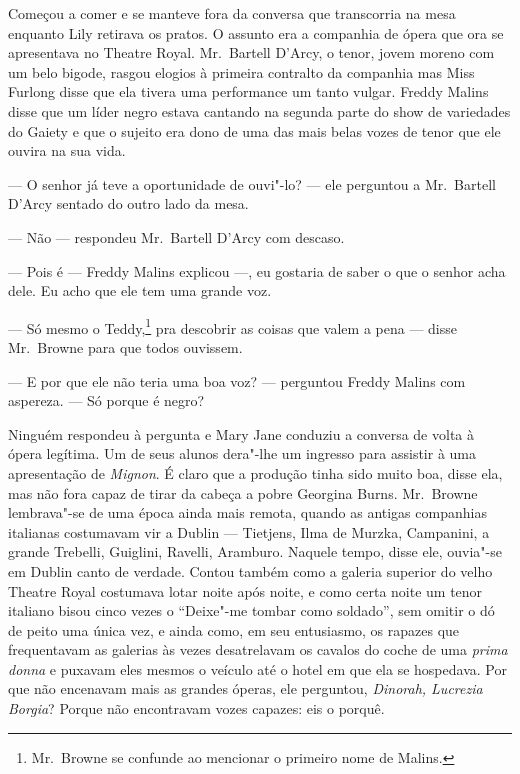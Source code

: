 Começou a comer e se manteve fora da conversa que transcorria na mesa enquanto
Lily retirava os pratos.  O assunto era a companhia de ópera que ora se
apresentava no Theatre Royal.  Mr.~Bartell D’Arcy, o tenor, jovem moreno com um
belo bigode, rasgou elogios à primeira contralto da companhia mas Miss Furlong
disse que ela tivera uma performance um tanto vulgar.  Freddy Malins disse que
um líder negro estava cantando na segunda parte do show de variedades do Gaiety
e que o sujeito era dono de uma das mais belas vozes de tenor que ele ouvira na
sua vida.

--- O senhor já teve a oportunidade de ouvi"-lo? --- ele perguntou a 
Mr.~Bartell D’Arcy sentado do outro lado da mesa.

--- Não --- respondeu Mr.~Bartell D’Arcy com descaso.

--- Pois é --- Freddy Malins explicou ---, eu gostaria de saber o que o senhor
acha dele.  Eu acho que ele tem uma grande voz.

--- Só mesmo o Teddy,\footnote{ Mr.~Browne se confunde ao mencionar o primeiro
nome de Malins.} pra descobrir as coisas que valem a pena --- disse
Mr.~Browne para que todos ouvissem.

--- E por que ele não teria uma boa voz? --- perguntou Freddy Malins com
aspereza.  --- Só porque é negro?

Ninguém respondeu à pergunta e Mary Jane conduziu a conversa de volta à ópera
legítima.  Um de seus alunos dera"-lhe um ingresso para assistir à uma
apresentação de \textit{Mignon}.  É claro que a produção tinha sido muito boa,
disse ela, mas não fora capaz de tirar da cabeça a pobre Georgina Burns.  
Mr.~Browne lembrava"-se de uma época ainda mais remota, quando as antigas companhias
italianas costumavam vir a Dublin --- Tietjens, Ilma de Murzka, Campanini, a
grande Trebelli, Guiglini, Ravelli, Aramburo.  Naquele tempo, disse ele,
ouvia"-se em Dublin canto de verdade.  Contou também como a galeria superior do
velho Theatre Royal costumava lotar noite após noite, e como certa noite um
tenor italiano bisou cinco vezes o “Deixe"-me tombar como soldado”, sem omitir o
dó de peito uma única vez, e ainda como, em seu entusiasmo, os rapazes que
frequentavam as galerias às vezes desatrelavam os cavalos do coche de uma
\textit{prima donna} e puxavam eles mesmos o veículo até o hotel em que ela se
hospedava.  Por que não encenavam mais as grandes óperas, ele perguntou,
\textit{Dinorah, Lucrezia Borgia}?  Porque não encontravam vozes capazes: eis o
porquê.

